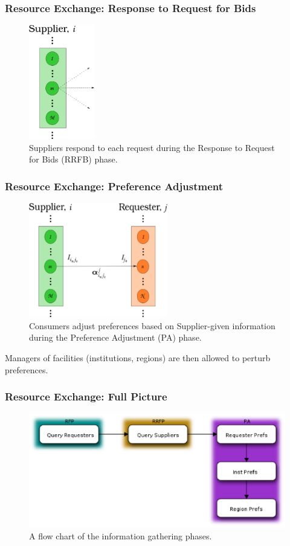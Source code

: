 \begin{frame}[ctb!]
  \frametitle{Resource Exchange: Response to Request for Bids}
  \begin{figure}
    \includegraphics[height=5cm]{./images/supplier.eps}
    \caption{Suppliers respond to each request during the Response to Request
      for Bids (RRFB) phase.}
  \end{figure}
\end{frame}

\begin{frame}[ctb!]
  \frametitle{Resource Exchange: Preference Adjustment}
  \begin{figure}
    \includegraphics[height=5cm]{./images/supplier-requester.eps}
    \caption{Consumers adjust preferences based on Supplier-given information
      during the Preference Adjustment (PA) phase.}
  \end{figure}

  Managers of facilities (institutions, regions) are then allowed to perturb
  preferences.
\end{frame}

\begin{frame}[ctb!]
  \frametitle{Resource Exchange: Full Picture}
  \begin{figure}
    \includegraphics[height=5cm]{./images/exchange.eps}
    \caption{A flow chart of the information gathering phases.}
  \end{figure}
\end{frame}


